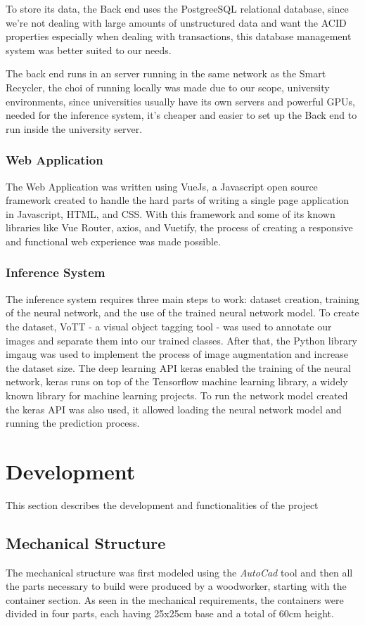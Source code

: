 \documentclass[a4paper,11pt]{article}
\begin{document}
To store its data, the Back end uses the PostgreeSQL relational database, since we’re not dealing with large amounts of unstructured data and want the ACID properties especially when dealing with transactions, this database management system was better suited to our needs.

The back end runs in an server running in the same network as the Smart Recycler, the choi of running locally was made due to our scope, university environments, since universities usually have its own servers and powerful GPUs, needed for the inference system, it’s cheaper and easier to set up the Back end to run inside the university server.


\subsubsection{Web Application}
The Web Application was written using VueJs, a Javascript open source framework created to handle the hard parts of writing a single page application in Javascript, HTML, and CSS. With this framework and some of its known libraries like Vue Router, axios, and Vuetify, the process of creating a responsive and functional web experience was made possible.

\subsubsection{Inference System}
The inference system requires three main steps to work: dataset creation, training of the neural network, and the use of the trained neural network model. To create the dataset, VoTT - a visual object tagging tool - was used to annotate our images and separate them into our trained classes. After that, the Python library imgaug was used to implement the process of image augmentation and increase the dataset size. The deep learning API keras enabled the training of the neural network, keras runs on top of the Tensorflow machine learning library, a widely known library for machine learning projects. To run the network model created the keras API was also used, it allowed loading the neural network model and running the prediction process.

\section{Development}
\label{sec:dev}
This section describes the development and functionalities of the project

\subsection{Mechanical Structure}
The mechanical structure was first modeled using the \textit{AutoCad} tool and then all the parts necessary to build were produced by a woodworker, starting with the container section. As seen in the mechanical requirements, the containers were divided in four parts, each having 25x25cm base and a total of 60cm height.
\end{document}
